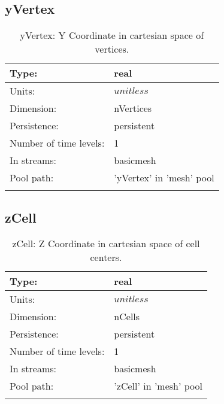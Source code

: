 \subsection[yVertex]{yVertex}
\label{subsec:var_sec_mesh_yVertex}
\begin{center}
\begin{longtable}{| p{2.0in} | p{4.0in} |}
        \hline 
        Type: & real \\
        \hline 
        Units: & $unitless$ \\
        \hline 
        Dimension: & nVertices \\
        \hline 
        Persistence: & persistent \\
        \hline 
        Number of time levels: & 1 \\
        \hline 
		 In streams: &  basicmesh \\
        \hline 
            Pool path: & 'yVertex' in 'mesh' pool
 \\
		 \hline 
    \caption{yVertex: Y Coordinate in cartesian space of vertices.}
\end{longtable}
\end{center}
\subsection[zCell]{zCell}
\label{subsec:var_sec_mesh_zCell}
\begin{center}
\begin{longtable}{| p{2.0in} | p{4.0in} |}
        \hline 
        Type: & real \\
        \hline 
        Units: & $unitless$ \\
        \hline 
        Dimension: & nCells \\
        \hline 
        Persistence: & persistent \\
        \hline 
        Number of time levels: & 1 \\
        \hline 
		 In streams: &  basicmesh \\
        \hline 
            Pool path: & 'zCell' in 'mesh' pool
 \\
		 \hline 
    \caption{zCell: Z Coordinate in cartesian space of cell centers.}
\end{longtable}
\end{center}
